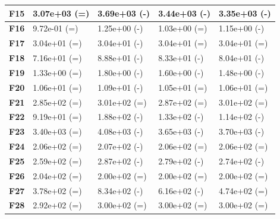 \documentclass[12pt,a4paper]{report}
\begin{document}
{{{{{{{\begin{table}[h]
\begin{tabular}{|l|l|l|l|l|}
{\bf F15} & 3.07e+03 (=) & 3.69e+03 (-)       & 3.44e+03 (-)       & 3.35e+03 (-)       \\ \hline
{\bf F16} & 9.72e-01 (=) & 1.25e+00 (-)       & 1.03e+00 (=)       & 1.15e+00 (-)       \\ \hline
{\bf F17} & 3.04e+01 (=) & 3.04e+01 (-)       & 3.04e+01 (=)       & 3.04e+01 (=)       \\ \hline
{\bf F18} & 7.16e+01 (=) & 8.88e+01 (-)       & 8.33e+01 (-)       & 8.04e+01 (-)       \\ \hline
{\bf F19} & 1.33e+00 (=) & 1.80e+00 (-)       & 1.60e+00 (-)       & 1.48e+00 (-)       \\ \hline
{\bf F20} & 1.06e+01 (=) & 1.09e+01 (-)       & 1.05e+01 (=)       & 1.06e+01 (=)       \\ \hline
{\bf F21} & 2.85e+02 (=) & 3.01e+02 (=)       & 2.87e+02 (=)       & 3.01e+02 (=)       \\ \hline
{\bf F22} & 9.19e+01 (=) & 1.88e+02 (-)       & 1.33e+02 (-)       & 1.14e+02 (-)       \\ \hline
{\bf F23} & 3.40e+03 (=) & 4.08e+03 (-)       & 3.65e+03 (-)       & 3.70e+03 (-)       \\ \hline
{\bf F24} & 2.06e+02 (=) & 2.07e+02 (-)       & 2.06e+02 (=)       & 2.06e+02 (=)       \\ \hline
{\bf F25} & 2.59e+02 (=) & 2.87e+02 (-)       & 2.79e+02 (-)       & 2.74e+02 (-)       \\ \hline
{\bf F26} & 2.04e+02 (=) & 2.00e+02 (=)       & 2.00e+02 (=)       & 2.00e+02 (=)       \\ \hline
{\bf F27} & 3.78e+02 (=) & 8.34e+02 (-)       & 6.16e+02 (-)       & 4.74e+02 (=)       \\ \hline
{\bf F28} & 2.92e+02 (=) & 3.00e+02 (=)       & 3.00e+02 (=)       & 3.00e+02 (=)       \\ \hline
\end{tabular}
\end{table}

}}}}}}}
\end{document}
